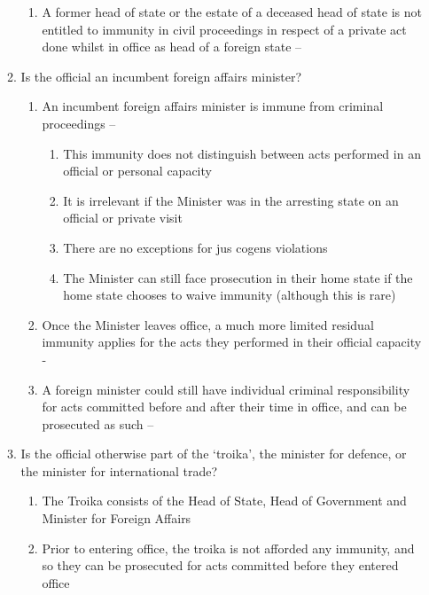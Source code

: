 \begin{enumerate}
\begin{enumerate}
\begin{enumerate}
            \item A former head of state or the estate of a deceased head of state is not entitled to immunity in civil proceedings in respect of a private act done whilst in office as head of a foreign state -- 
        \end{enumerate}
        \item Is the official an incumbent foreign affairs minister?
        \begin{enumerate}
            \item An incumbent foreign affairs minister is immune from criminal proceedings -- 
            \begin{enumerate}
                \item This immunity does not distinguish between acts performed in an official or personal capacity
                \item It is irrelevant if the Minister was in the arresting state on an official or private visit
                \item There are no exceptions for \gls{jus cogens} violations
                \item The Minister can still face prosecution in their home state if the home state chooses to waive immunity (although this is rare)
            \end{enumerate}
            \item Once the Minister leaves office, a much more limited residual immunity applies for the acts they performed in their official capacity - 
            \item A foreign minister could still have individual criminal responsibility for acts committed before and after their time in office, and can be prosecuted as such -- 
        \end{enumerate}
        \item Is the official otherwise part of the `troika', the minister for defence, or the minister for international trade?
        \begin{enumerate}
            \item The Troika consists of the Head of State, Head of Government and Minister for Foreign Affairs
            \item Prior to entering office, the troika is not afforded any immunity, and so they can be prosecuted for acts committed before they entered office

\end{enumerate}
\end{enumerate}
\end{enumerate}
